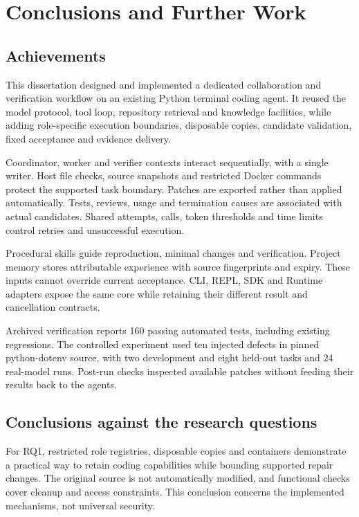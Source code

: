 \chapter{Conclusions and Further Work}\label{chap:8}

\section{Achievements}\label{sec:8.1}

This dissertation designed and implemented a dedicated collaboration and verification workflow on an existing Python terminal coding agent. It reused the model protocol, tool loop, repository retrieval and knowledge facilities, while adding role-specific execution boundaries, disposable copies, candidate validation, fixed acceptance and evidence delivery.

Coordinator, worker and verifier contexts interact sequentially, with a single writer. Host file checks, source snapshots and restricted Docker commands protect the supported task boundary. Patches are exported rather than applied automatically. Tests, reviews, usage and termination causes are associated with actual candidates. Shared attempts, calls, token thresholds and time limits control retries and unsuccessful execution.

Procedural skills guide reproduction, minimal changes and verification. Project memory stores attributable experience with source fingerprints and expiry. These inputs cannot override current acceptance. CLI, REPL, SDK and Runtime adapters expose the same core while retaining their different result and cancellation contracts.

Archived verification reports 160 passing automated tests, including existing regressions. The controlled experiment used ten injected defects in pinned python-dotenv source, with two development and eight held-out tasks and 24 real-model runs. Post-run checks inspected available patches without feeding their results back to the agents.

\section{Conclusions against the research questions}\label{sec:8.2}

For RQ1, restricted role registries, disposable copies and containers demonstrate a practical way to retain coding capabilities while bounding supported repair changes. The original source is not automatically modified, and functional checks cover cleanup and access constraints. This conclusion concerns the implemented mechanisms, not universal security.

